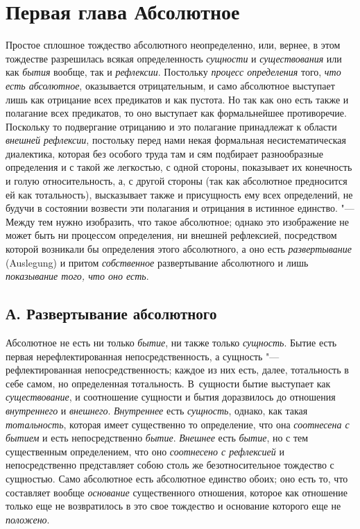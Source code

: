 \chapter[{\em Первая глава} Абсолютное]{Первая глава Абсолютное}

Простое сплошное тождество абсолютного неопределенно, или, вернее, в этом
тождестве разрешилась всякая определенность {\em сущности} и
{\em существования} или как {\em бытия} вообще, так и {\em рефлексии}.
Постольку {\em процесс определения} того, {\em что есть абсолютное},
оказывается отрицательным, и
само абсолютное выступает лишь как отрицание всех предикатов и как пустота.
Но так как оно есть также и полагание всех предикатов, то оно выступает как
формальнейшее противоречие. Поскольку то подвергание отрицанию и это
полагание принадлежат к области {\em внешней
рефлексии}, постольку перед нами некая формальная несистематическая
диалектика, которая без особого труда там и сям подбирает разнообразные
определения и с такой же легкостью, с одной стороны, показывает их
конечность и голую относительность, а, с другой стороны (так как абсолютное
предносится ей как тотальность), высказывает также и присущность ему всех
определений, не будучи в состоянии возвести эти полагания и отрицания в
истинное единство. "--- Между тем нужно изобразить, что такое абсолютное;
однако это изображение не может быть ни процессом определения, ни внешней
рефлексией, посредством которой возникали бы определения этого абсолютного,
а оно есть {\em развертывание} (Auslegung) и притом
{\em собственное} развертывание абсолютного и лишь
{\em показывание того, что оно есть}.

\section[А. Развертывание абсолютного]{А. Развертывание абсолютного}

Абсолютное не есть ни только
{\em бытие}, ни также только
{\em сущность}. Бытие есть первая нерефлектированная
непосредственность, а сущность "--- рефлектированная непосредственность;
каждое из них есть, далее, тотальность в себе самом, но определенная
тотальность. В~сущности бытие выступает как
{\em существование}, и соотношение сущности и бытия
доразвилось до отношения {\em внутреннего} и
{\em внешнего}. {\em Внутреннее}
есть {\em сущность}, однако, как такая
{\em тотальность}, которая имеет существенно то
определение, что она {\em соотнесена с бытием} и есть
непосредственно {\em бытие}.
{\em Внешнее} есть {\em бытие}, но
с тем существенным определением, что оно
{\em соотнесено с рефлексией} и непосредственно
представляет собою столь же безотносительное тождество с сущностью. Само
абсолютное есть абсолютное единство обоих; оно есть то, что составляет
вообще {\em основание} существенного отношения, которое
как отношение только еще не возвратилось в это свое тождество и основание
которого еще не {\em положено}.

